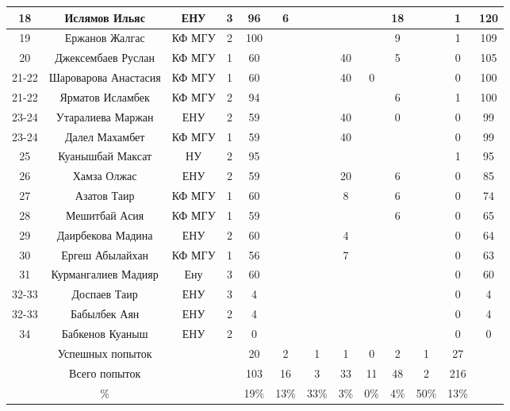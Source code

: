 \documentclass[10pt, a4paper, landscape]{article}
\begin{document}
\begin{center}
\begin{longtable}{|c|c|c|c|*{7}{c|}c|c|}
\hline
18 & Ислямов Ильяс & ЕНУ&  3 &  96   & 6  &  &  &  & 18  &  & 1 & 120\\
\hline
19 & Ержанов Жалгас & КФ МГУ&  2 &  100   &  &  &  &  & 9  &  & 1 & 109\\
\hline
20 & Джексембаев Руслан & КФ МГУ&  1 & 60  &  &  & 40  &  & 5  &  & 0 & 105\\
\hline
21-22 & Шароварова Анастасия & КФ МГУ&  1 & 60  &  &  & 40  & 0  &  &  & 0 & 100\\
\hline
21-22 & Ярматов Исламбек & КФ МГУ&  2 &  94   &  &  &  &  & 6  &  & 1 & 100\\
\hline
23-24 & Утаралиева Маржан & ЕНУ&  2 & 59  &  &  & 40  &  & 0  &  & 0 & 99\\
\hline
23-24 & Далел Махамбет & КФ МГУ&  1 & 59  &  &  & 40  &  &  &  & 0 & 99\\
\hline
25 & Куанышбай Максат & НУ &  2 &  95   &  &  &  &  &  &  & 1 & 95\\
\hline
26 & Хамза Олжас & ЕНУ&  2 & 59  &  &  & 20  &  & 6  &  & 0 & 85\\
\hline
27 & Азатов Таир & КФ МГУ&  1 & 60  &  &  & 8  &  & 6  &  & 0 & 74\\
\hline
28 & Мешитбай Асия & КФ МГУ&  1 & 59  &  &  &  &  & 6  &  & 0 & 65\\
\hline
29 & Даирбекова Мадина & ЕНУ&  2 & 60  &  &  & 4  &  &  &  & 0 & 64\\
\hline
30 & Ергеш Абылайхан & КФ МГУ&  1 & 56  &  &  & 7  &  &  &  & 0 & 63\\
\hline
31 & Курмангалиев Мадияр & Ену&  3 & 60  &  &  &  &  &  &  & 0 & 60\\
\hline
32-33 & Доспаев Таир & ЕНУ&  3 & 4  &  &  &  &  &  &  & 0 & 4\\
\hline
32-33 & Бабылбек Аян & ЕНУ&  2 & 4  &  &  &  &  &  &  & 0 & 4\\
\hline
34 & Бабкенов Куаныш & ЕНУ&  2 & 0  &  &  &  &  &  &  & 0 & 0\\
\hline
  & Успешных попыток & & & 20 & 2 & 1 & 1 & 0 & 2 & 1 & 27 &  \\
\hline
  & Всего попыток & & &103 & 16 & 3 & 33 & 11 & 48 & 2 & 216 & \\
\hline
  & \% & & & 19\% & 13\% & 33\% & 3\% & 0\% & 4\% & 50\% & 13\% &  \\
\hline
\end{longtable}
\end{center}

\renewcommand{\arraystretch}{1}
\end{document}
